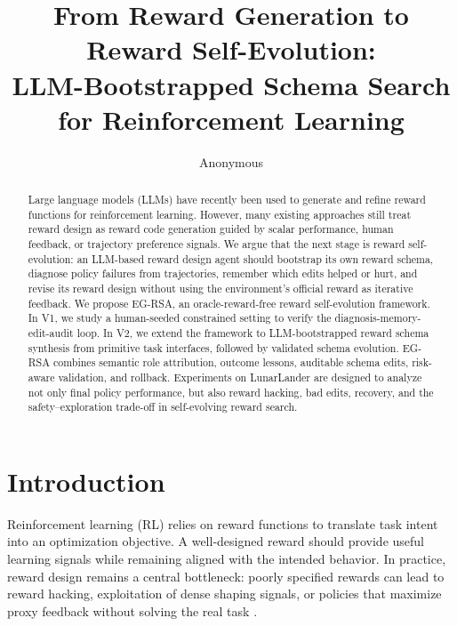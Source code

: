 \documentclass[11pt]{article}
\title{From Reward Generation to Reward Self-Evolution:\\LLM-Bootstrapped Schema Search for Reinforcement Learning}
\author{Anonymous}
\date{}
\begin{document}
\maketitle

\begin{abstract}
Large language models (LLMs) have recently been used to generate and refine reward functions for reinforcement learning. However, many existing approaches still treat reward design as reward code generation guided by scalar performance, human feedback, or trajectory preference signals. We argue that the next stage is reward self-evolution: an LLM-based reward design agent should bootstrap its own reward schema, diagnose policy failures from trajectories, remember which edits helped or hurt, and revise its reward design without using the environment's official reward as iterative feedback. We propose EG-RSA, an oracle-reward-free reward self-evolution framework. In V1, we study a human-seeded constrained setting to verify the diagnosis-memory-edit-audit loop. In V2, we extend the framework to LLM-bootstrapped reward schema synthesis from primitive task interfaces, followed by validated schema evolution. EG-RSA combines semantic role attribution, outcome lessons, auditable schema edits, risk-aware validation, and rollback. Experiments on LunarLander are designed to analyze not only final policy performance, but also reward hacking, bad edits, recovery, and the safety--exploration trade-off in self-evolving reward search.
\end{abstract}

\section{Introduction}
\label{sec:introduction}

Reinforcement learning (RL) relies on reward functions to translate task intent into an optimization objective. A well-designed reward should provide useful learning signals while remaining aligned with the intended behavior. In practice, reward design remains a central bottleneck: poorly specified rewards can lead to reward hacking, exploitation of dense shaping signals, or policies that maximize proxy feedback without solving the real task \citep{sutton2018reinforcement,amodei2016concrete,pan2022effects}.
\end{document}
